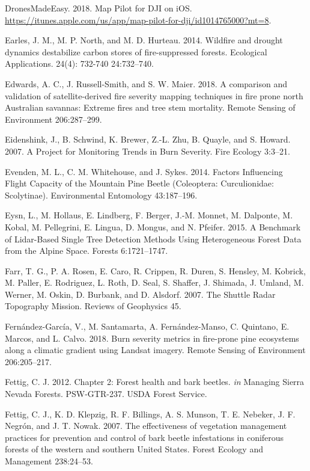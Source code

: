 \documentclass[twoside,12pt,final]{ucthesis-CA2012}
\begin{document}
\begin{ucmainmatter}
\hypertarget{ref-dronesmadeeasy2018}{}
DronesMadeEasy. 2018. ‎Map Pilot for DJI on iOS.
\url{https://itunes.apple.com/us/app/map-pilot-for-dji/id1014765000?mt=8}.

\hypertarget{ref-earles2014}{}
Earles, J. M., M. P. North, and M. D. Hurteau. 2014. Wildfire and
drought dynamics destabilize carbon stores of fire-suppressed forests.
Ecological Applications. 24(4): 732-740 24:732--740.

\hypertarget{ref-edwards2018}{}
Edwards, A. C., J. Russell-Smith, and S. W. Maier. 2018. A comparison
and validation of satellite-derived fire severity mapping techniques in
fire prone north Australian savannas: Extreme fires and tree stem
mortality. Remote Sensing of Environment 206:287--299.

\hypertarget{ref-eidenshink2007}{}
Eidenshink, J., B. Schwind, K. Brewer, Z.-L. Zhu, B. Quayle, and S.
Howard. 2007. A Project for Monitoring Trends in Burn Severity. Fire
Ecology 3:3--21.

\hypertarget{ref-evenden2014}{}
Evenden, M. L., C. M. Whitehouse, and J. Sykes. 2014. Factors
Influencing Flight Capacity of the Mountain Pine Beetle (Coleoptera:
Curculionidae: Scolytinae). Environmental Entomology 43:187--196.

\hypertarget{ref-eysn2015}{}
Eysn, L., M. Hollaus, E. Lindberg, F. Berger, J.-M. Monnet, M. Dalponte,
M. Kobal, M. Pellegrini, E. Lingua, D. Mongus, and N. Pfeifer. 2015. A
Benchmark of Lidar-Based Single Tree Detection Methods Using
Heterogeneous Forest Data from the Alpine Space. Forests 6:1721--1747.

\hypertarget{ref-farr2007}{}
Farr, T. G., P. A. Rosen, E. Caro, R. Crippen, R. Duren, S. Hensley, M.
Kobrick, M. Paller, E. Rodriguez, L. Roth, D. Seal, S. Shaffer, J.
Shimada, J. Umland, M. Werner, M. Oskin, D. Burbank, and D. Alsdorf.
2007. The Shuttle Radar Topography Mission. Reviews of Geophysics 45.

\hypertarget{ref-fernandez-garcia2018}{}
Fernández-García, V., M. Santamarta, A. Fernández-Manso, C. Quintano, E.
Marcos, and L. Calvo. 2018. Burn severity metrics in fire-prone pine
ecosystems along a climatic gradient using Landsat imagery. Remote
Sensing of Environment 206:205--217.

\hypertarget{ref-fettig2012b}{}
Fettig, C. J. 2012. Chapter 2: Forest health and bark beetles. \emph{in}
Managing Sierra Nevada Forests. PSW-GTR-237. USDA Forest Service.

\hypertarget{ref-fettig2007}{}
Fettig, C. J., K. D. Klepzig, R. F. Billings, A. S. Munson, T. E.
Nebeker, J. F. Negrón, and J. T. Nowak. 2007. The effectiveness of
vegetation management practices for prevention and control of bark
beetle infestations in coniferous forests of the western and southern
United States. Forest Ecology and Management 238:24--53.


\end{ucmainmatter}
\end{document}
